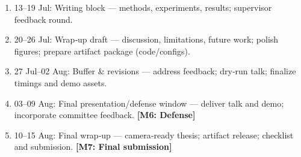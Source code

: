 \documentclass[11pt,a4paper]{article}
\begin{document}
\begin{enumerate}[label=\textbf{W\arabic*}, leftmargin=*]
  \item 13--19 Jul: Writing block — methods, experiments, results; supervisor feedback round.
  \item 20--26 Jul: Wrap‑up draft — discussion, limitations, future work; polish figures; prepare artifact package (code/configs).
  \item 27 Jul--02 Aug: Buffer \& revisions — address feedback; dry‑run talk; finalize timings and demo assets.
  \item 03--09 Aug: Final presentation/defense window — deliver talk and demo; incorporate committee feedback. \textbf{[M6: Defense]}
  \item 10--15 Aug: Final wrap‑up — camera‑ready thesis; artifact release; checklist and submission. \textbf{[M7: Final submission]}
\end{enumerate}
\end{document}
